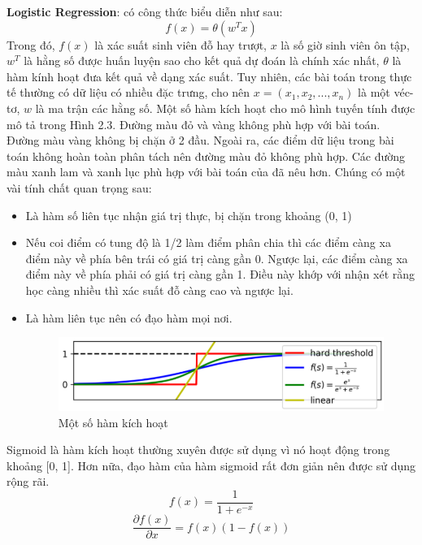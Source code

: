 \textbf{Logistic Regression}: có công thức biểu diễn như sau:
\begin{equation}
    f(x) = \theta(w^T x)
\end{equation}
Trong đó, $f(x)$ là xác suất sinh viên đỗ hay trượt, $x$ là số giờ sinh viên ôn tập, $w^T$ là hằng số 
được huấn luyện sao cho kết quả dự đoán là chính xác nhất, $\theta$ là hàm kính hoạt đưa kết 
quả về dạng xác suất. Tuy nhiên, các bài toán trong thực tế thường có dữ liệu có nhiều đặc 
trưng, cho nên $x=(x_1, x_2, ..., x_n)$ là một véc-tơ, $w$ là ma trận các hằng số. Một số hàm kích hoạt cho mô hình tuyến tính được mô tả trong Hình 2.3. Đường
màu đỏ và vàng không phù hợp với bài toán. Đường màu vàng không bị chặn ở 2 đầu.
Ngoài ra, các điểm dữ liệu trong bài toán không hoàn toàn phân tách nên đường màu đỏ
không phù hợp. Các đường màu xanh lam và xanh lục phù hợp với bài toán của đã nêu
hơn. Chúng có một vài tính chất quan trọng sau:
\begin{itemize}
    \item Là hàm số liên tục nhận giá trị thực, bị chặn trong khoảng (0, 1)
    \item Nếu coi điểm có tung độ là 1/2 làm điểm phân chia thì các điểm càng xa điểm
    này về phía bên trái có giá trị càng gần 0. Ngược lại, các điểm càng xa điểm này
    về phía phải có giá trị càng gần 1. Điều này khớp với nhận xét rằng học càng
    nhiều thì xác suất đỗ càng cao và ngược lại.
    \item Là hàm liên tục nên có đạo hàm mọi nơi.
    \begin{figure}[htbp]
        \centering
        \includegraphics[width=1\linewidth]{imgs//chapter_2/activation_function.png}
        \caption{Một số hàm kích hoạt}
        \label{activation_function}
    \end{figure}
\end{itemize}

Sigmoid là hàm kích hoạt thường xuyên được sử dụng vì nó hoạt động trong khoảng [0, 1]. Hơn nữa, 
đạo hàm của hàm sigmoid rất đơn giản nên được sử dụng rộng rãi.
\begin{equation}
    f(x) = \frac{1}{1+e^{-x}}
\end{equation}
\begin{equation}
    \frac{\partial f(x)}{\partial x} = f(x)(1-f(x))
\end{equation}

